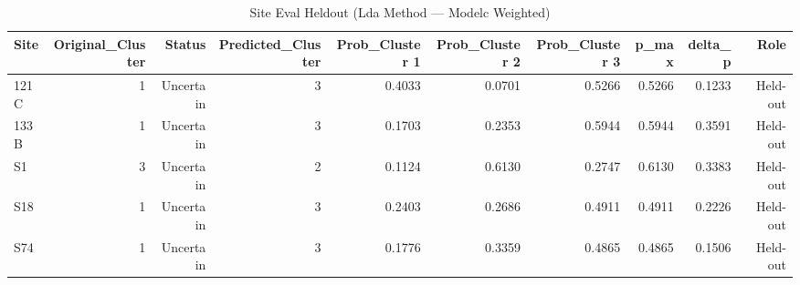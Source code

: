 \begin{table}[htbp]
  \centering
  \caption{Site Eval Heldout (Lda Method — Modelc Weighted)}
  \label{tab:LDA_Method_ModelC_Weighted_tables_site_eval_heldout}
  \small
  \begin{tabular}{lrrrrrrrrr}
    \toprule
    Site & Original\_Cluster & Status & Predicted\_Cluster & Prob\_Cluster 1 & Prob\_Cluster 2 & Prob\_Cluster 3 & p\_max & delta\_p & Role \\
    \midrule
    121C & 1 & Uncertain & 3 & 0.4033 & 0.0701 & 0.5266 & 0.5266 & 0.1233 & Held-out \\
    133B & 1 & Uncertain & 3 & 0.1703 & 0.2353 & 0.5944 & 0.5944 & 0.3591 & Held-out \\
    S1 & 3 & Uncertain & 2 & 0.1124 & 0.6130 & 0.2747 & 0.6130 & 0.3383 & Held-out \\
    S18 & 1 & Uncertain & 3 & 0.2403 & 0.2686 & 0.4911 & 0.4911 & 0.2226 & Held-out \\
    S74 & 1 & Uncertain & 3 & 0.1776 & 0.3359 & 0.4865 & 0.4865 & 0.1506 & Held-out \\
    \bottomrule
  \end{tabular}
\end{table}
